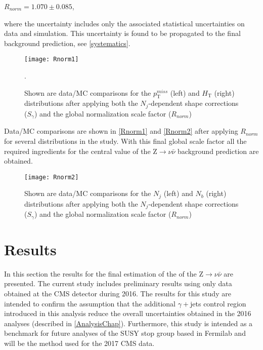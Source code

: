 \begingroup
	\begin{center}
		$R_{norm} = 1.070 \pm 0.085$,
	\end{center}
\endgroup

\noindent where the uncertainty includes only the associated statistical uncertainties on data and simulation. This uncertainty is found to be propagated to the final background prediction, see \autoref{systematics}.\\

\begin{figure}[H]
\begin{center}
\texttt{[image: Rnorm1]}
\end{center}
\vspace{-1em}
\caption{Shown are data/MC comparisons for the $p_\text{T}^{miss}$ (left) and $H_\text{T}$ (right) distributions after applying both the $N_j$-dependent shape corrections ($S_\gamma$) and the global normalization scale factor ($R_{norm}$)}.
\label{Rnorm1}
\end{figure}

Data/MC comparisons are shown in \autoref{Rnorm1} and \autoref{Rnorm2} after applying $R_{norm}$ for several distributions in the study. With this final global scale factor all the required ingredients for the central value of the Z$\rightarrow\nu\bar{\nu}$ background prediction are obtained. 

\begin{figure}[H]
\begin{center}
\texttt{[image: Rnorm2]}
\end{center}
\vspace{-1em}
\caption{Shown are data/MC comparisons for the $N_j$ (left) and $N_b$ (right) distributions after applying both the $N_j$-dependent shape corrections ($S_\gamma$) and the global normalization scale factor ($R_{norm}$)}
\label{Rnorm2}
\end{figure}

\section{Results}

In this section the results for the final estimation of the of the Z$\rightarrow\nu\bar{\nu}$ are presented. The current study includes preliminary results using only data obtained at the CMS detector during 2016. The results for this study are intended to confirm the assumption that the additional $\gamma+$jets control region introduced in this analysis reduce the overall uncertainties obtained in the 2016 analyses (described in \autoref{AnalysisChap}). Furthermore, this study is intended as a benchmark for future analyses of the SUSY stop group based in Fermilab and will be the method used for the 2017 CMS data.

